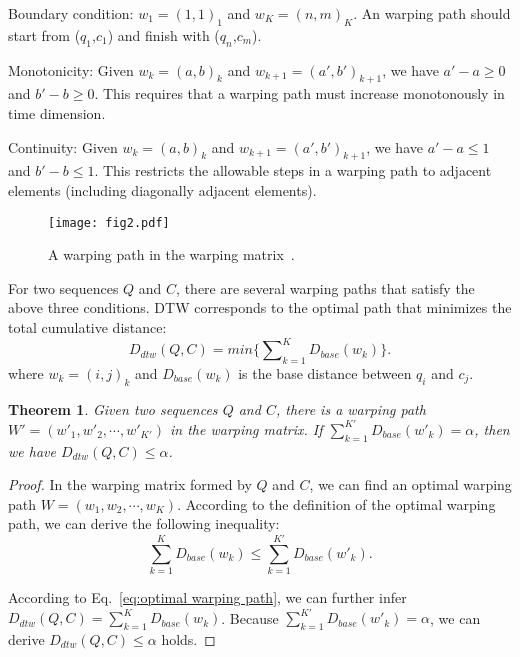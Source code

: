 \documentclass[10pt,journal,compsoc]{IEEEtran}
\newtheorem{theorem}{Theorem}
\begin{document}
Boundary condition: $w_1=(1, 1)_1$ and $w_K=(n, m)_K$.
An warping path should start from ($q_1$,$c_1$) and finish with ($q_n$,$c_m$).

Monotonicity: Given $w_k=(a, b)_k$ and $w_{k+1}=(a', b')_{k+1}$, we have $a'-a\geq 0$ and $b'-b\geq 0$.
This requires that a warping path must increase monotonously in time dimension.

Continuity: Given $w_k=(a, b)_k$ and $w_{k+1}=(a', b')_{k+1}$, we have $a'-a\leq 1$ and $b'-b\leq 1$.
This restricts the allowable steps in a warping path to adjacent elements (including diagonally adjacent elements).


\begin{figure}[htbp]
  \centering
  \texttt{[image: fig2.pdf]}
  \caption{A warping path in the warping matrix~\cite{keogh2005exact}.}
  \label{fig:the warping path}
\end{figure}



For two sequences $Q$ and $C$,
there are several warping paths that satisfy the above three conditions.
DTW corresponds to the optimal path that minimizes the total cumulative distance:
\begin{equation}\label{eq:optimal warping path}
 D_{dtw}(Q,C) = min \{ \sum\nolimits_{k=1}^K {D_{base}{(w_k)}} \}.
\end{equation}
where $w_k=(i,j)_k$ and $D_{base}{(w_k)}$ is the base distance between $q_i$ and $c_j$.

\begin{theorem} \label{theorem:1}
  Given two sequences $Q$ and $C$,
  there is a warping path $W'=(w'_1,w'_2, \cdots,w'_{K'})$ in the warping matrix.
  If $\sum_{k=1}^{K'} D_{base}(w'_k)=\alpha$, then we have $D_{dtw}(Q,C)\leq\alpha$.
\end{theorem}

\begin{proof}
  In the warping matrix formed by $Q$ and $C$,
  we can find an optimal warping path $W=(w_1,w_2, \cdots,w_K)$.
  According to the definition of the optimal warping path,
  we can derive the following inequality:
\begin{equation}\label{eq:warping path}
    \sum_{k=1}^{K} D_{base}(w_k) \leq \sum_{k=1}^{K'} D_{base}(w'_k).
\end{equation}

  According to Eq.~\eqref{eq:optimal warping path}, we can further infer
  $D_{dtw}(Q,C) = \sum\nolimits_{k=1}^K {D_{base}{(w_k)}}$.
  Because $\sum_{k=1}^{K'} D_{base}(w'_k)=\alpha$, we can derive $D_{dtw}(Q,C)\leq\alpha$ holds.
\end{proof}
\end{document}
